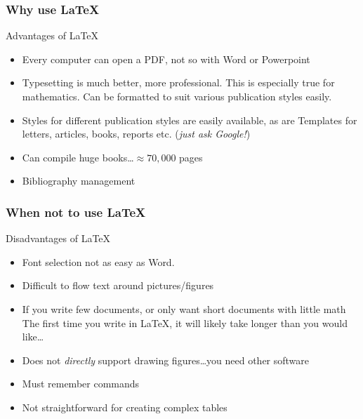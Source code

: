 \begin{frame}
\frametitle{Why use \LaTeX}
\begin{block}{Advantages of \LaTeX}
\begin{itemize}
\item Every computer can open a PDF, not so with Word or Powerpoint
\item Typesetting is much better, more professional.  This is especially true for mathematics.  Can be formatted to suit various publication styles easily.
\item Styles for different publication styles are easily available, as are Templates for letters, articles, books, reports etc. (\emph{just ask Google!})
\item Can compile huge books\ldots $\approx70,000$ pages
\item Bibliography management
\end{itemize}
\end{block}
\end{frame}

\begin{frame}
\frametitle{When not to use \LaTeX}
\begin{block}{Disadvantages of \LaTeX}
\begin{itemize}
\item Font selection not as easy as Word.
\item Difficult to flow text around pictures\slash figures
\item If you write few documents, or only want short documents with little math
The first time you write in \LaTeX, it will likely take longer than you would like\ldots
\item Does not \emph{directly} support drawing figures\ldots you need other software
\item Must remember commands
\item Not straightforward for creating complex tables
\end{itemize}
\end{block}
\end{frame}

